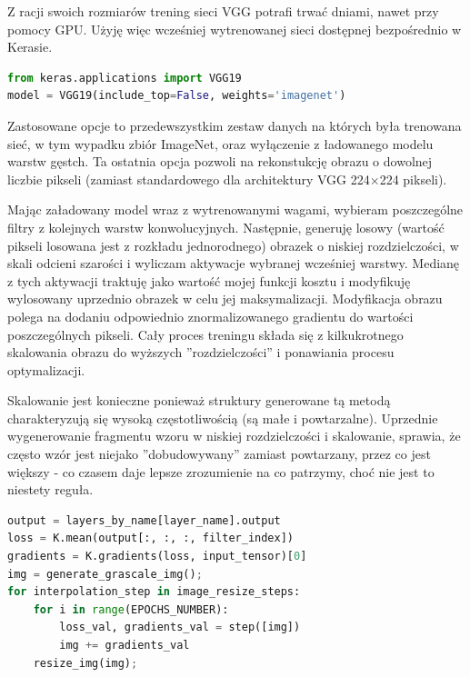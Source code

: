 Z racji swoich rozmiarów trening sieci VGG potrafi trwać dniami, nawet przy pomocy GPU. Użyję więc wcześniej wytrenowanej sieci dostępnej bezpośrednio w Kerasie.

\label{lst:vggkeras}
\begin{lstlisting}[language=Python, caption={Wczytywanie wag VGG-19 w Keras.}, captionpos=b]
from keras.applications import VGG19
model = VGG19(include_top=False, weights='imagenet')
\end{lstlisting}

Zastosowane opcje to przedewszystkim zestaw danych na których była trenowana sieć, w tym wypadku zbiór ImageNet\cite{imagenet}, oraz wyłączenie z ładowanego modelu warstw gęstch. Ta ostatnia opcja pozwoli na rekonstukcję obrazu o dowolnej liczbie pikseli (zamiast standardowego dla architektury VGG 224\(\times\)224 pikseli).

Mając załadowany model wraz z wytrenowanymi wagami, wybieram poszczególne filtry z kolejnych warstw konwolucyjnych. Następnie, generuję losowy (wartość pikseli losowana jest z rozkładu jednorodnego) obrazek o niskiej rozdzielczości, w skali odcieni szarości i wyliczam aktywacje wybranej wcześniej warstwy. Medianę z tych aktywacji traktuję jako wartość mojej funkcji kosztu i modyfikuję wylosowany uprzednio obrazek w celu jej maksymalizacji.
Modyfikacja obrazu polega na dodaniu odpowiednio znormalizowanego gradientu do wartości poszczególnych pikseli. Cały proces treningu składa się z kilkukrotnego skalowania obrazu do wyższych ''rozdzielczości'' i ponawiania procesu optymalizacji. 

Skalowanie jest konieczne ponieważ struktury generowane tą metodą charakteryzują się wysoką częstotliwością (są małe i powtarzalne). Uprzednie wygenerowanie fragmentu wzoru w niskiej rozdzielczości i skalowanie, sprawia, że często wzór jest niejako ''dobudowywany'' zamiast powtarzany, przez co jest większy - co czasem daje lepsze zrozumienie na co patrzymy, choć nie jest to niestety reguła.

\label{lst:vggmeantraining}
\begin{lstlisting}[language=Python, caption={Wizualizowanie poprzez maksymalizację mediany wybranej warstwy.}, captionpos=b]
output = layers_by_name[layer_name].output
loss = K.mean(output[:, :, :, filter_index])
gradients = K.gradients(loss, input_tensor)[0]
img = generate_grascale_img();
for interpolation_step in image_resize_steps:
    for i in range(EPOCHS_NUMBER):
        loss_val, gradients_val = step([img])
        img += gradients_val 
    resize_img(img);
\end{lstlisting}

